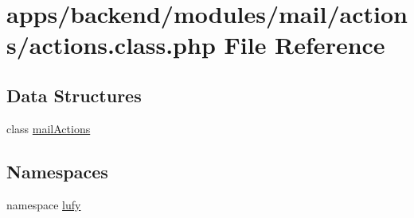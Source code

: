 \hypertarget{backend_2modules_2mail_2actions_2actions_8class_8php}{\section{apps/backend/modules/mail/actions/actions.class.\-php File Reference}
\label{backend_2modules_2mail_2actions_2actions_8class_8php}
}
\subsection*{Data Structures}
\begin{DoxyCompactItemize}
\item 
class \hyperlink{classmail_actions}{mail\-Actions}
\end{DoxyCompactItemize}
\subsection*{Namespaces}
\begin{DoxyCompactItemize}
\item 
namespace \hyperlink{namespacelufy}{lufy}
\end{DoxyCompactItemize}
